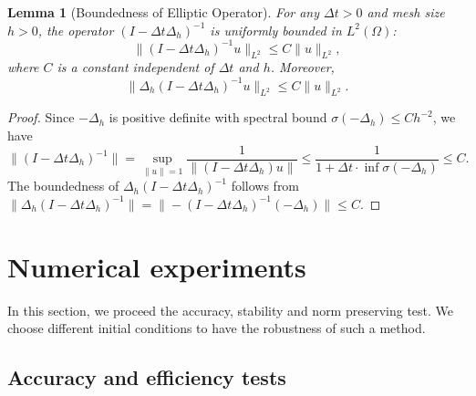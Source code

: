 \documentclass[preprint,times,3p]{elsarticle}
\newtheorem{lemma}{Lemma}
\def\e{\mbox{\boldmath $e$}}
\def\m{\mbox{\boldmath $m$}}
\begin{document}
\begin{lemma}[Boundedness of Elliptic Operator]
For any $\Delta t > 0$ and mesh size $h > 0$, the operator $(I - \Delta t \Delta_h)^{-1}$ is uniformly bounded in $L^2(\Omega)$:
\[
\|(I - \Delta t \Delta_h)^{-1} u\|_{L^2} \leq C \|u\|_{L^2},
\]
where $C$ is a constant independent of $\Delta t$ and $h$. Moreover,
\[
\|\Delta_h (I - \Delta t \Delta_h)^{-1} u\|_{L^2} \leq C \|u\|_{L^2}.
\]
\end{lemma}

\begin{proof}
Since $-\Delta_h$ is positive definite with spectral bound $\sigma(-\Delta_h) \leq C h^{-2}$, we have
\[
\|(I - \Delta t \Delta_h)^{-1}\| = \sup_{\|u\|=1} \frac{1}{\|(I - \Delta t \Delta_h)u\|} \leq \frac{1}{1 + \Delta t \cdot \inf\sigma(-\Delta_h)} \leq C.
\]
The boundedness of $\Delta_h (I - \Delta t \Delta_h)^{-1}$ follows from $\|\Delta_h (I - \Delta t \Delta_h)^{-1}\| = \|-(I - \Delta t \Delta_h)^{-1}(-\Delta_h)\| \leq C$.
\end{proof}





\section{Numerical experiments}
\label{sec:experiments}

In this section, we proceed the accuracy, stability and norm preserving test. We choose different initial conditions to have the robustness of such a method.

\subsection{Accuracy and efficiency tests}
\end{document}
